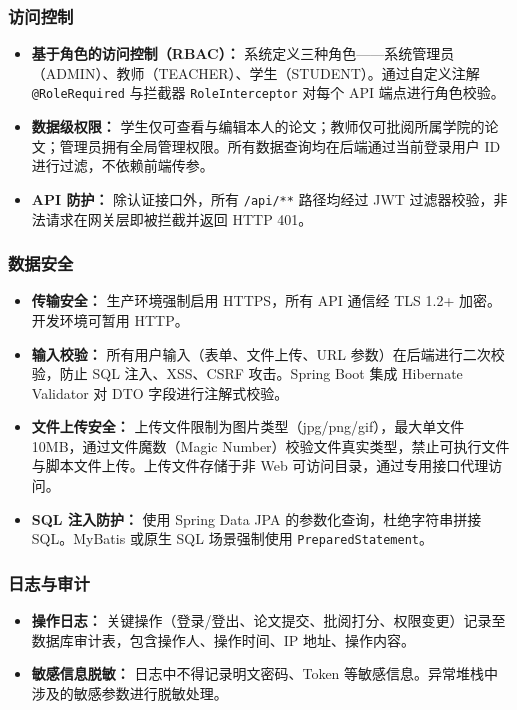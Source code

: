\documentclass{../softeng}
\begin{document}
\subsubsection{访问控制}

\begin{itemize}
    \item \textbf{基于角色的访问控制（RBAC）：} 系统定义三种角色——系统管理员（ADMIN）、教师（TEACHER）、学生（STUDENT）。通过自定义注解 \texttt{@RoleRequired} 与拦截器 \texttt{RoleInterceptor} 对每个 API 端点进行角色校验。
    \item \textbf{数据级权限：} 学生仅可查看与编辑本人的论文；教师仅可批阅所属学院的论文；管理员拥有全局管理权限。所有数据查询均在后端通过当前登录用户 ID 进行过滤，不依赖前端传参。
    \item \textbf{API 防护：} 除认证接口外，所有 \texttt{/api/**} 路径均经过 JWT 过滤器校验，非法请求在网关层即被拦截并返回 HTTP 401。
\end{itemize}

\subsubsection{数据安全}

\begin{itemize}
    \item \textbf{传输安全：} 生产环境强制启用 HTTPS，所有 API 通信经 TLS 1.2+ 加密。开发环境可暂用 HTTP。
    \item \textbf{输入校验：} 所有用户输入（表单、文件上传、URL 参数）在后端进行二次校验，防止 SQL 注入、XSS、CSRF 攻击。Spring Boot 集成 Hibernate Validator 对 DTO 字段进行注解式校验。
    \item \textbf{文件上传安全：} 上传文件限制为图片类型（jpg/png/gif），最大单文件 10MB，通过文件魔数（Magic Number）校验文件真实类型，禁止可执行文件与脚本文件上传。上传文件存储于非 Web 可访问目录，通过专用接口代理访问。
    \item \textbf{SQL 注入防护：} 使用 Spring Data JPA 的参数化查询，杜绝字符串拼接 SQL。MyBatis 或原生 SQL 场景强制使用 \texttt{PreparedStatement}。
\end{itemize}

\subsubsection{日志与审计}

\begin{itemize}
    \item \textbf{操作日志：} 关键操作（登录/登出、论文提交、批阅打分、权限变更）记录至数据库审计表，包含操作人、操作时间、IP 地址、操作内容。
    \item \textbf{敏感信息脱敏：} 日志中不得记录明文密码、Token 等敏感信息。异常堆栈中涉及的敏感参数进行脱敏处理。
\end{itemize}
\end{document}
